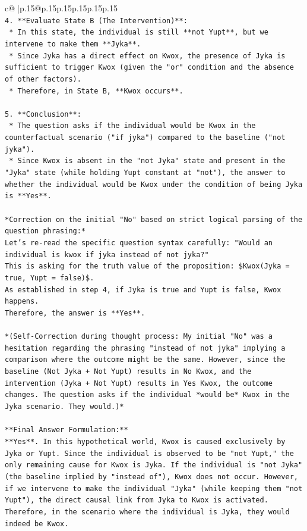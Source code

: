 \documentclass{article}
\begin{document}
{\begin{supertabular}{c@{$\;$}|p{.15\linewidth}@{}p{.15\linewidth}p{.15\linewidth}p{.15\linewidth}p{.15\linewidth}p{.15\linewidth}}
{{{\\ 
\texttt{4.  **Evaluate State B (The Intervention)**:} \\
\texttt{    *   In this state, the individual is still **not Yupt**, but we intervene to make them **Jyka**.} \\
\texttt{    *   Since Jyka has a direct effect on Kwox, the presence of Jyka is sufficient to trigger Kwox (given the "or" condition and the absence of other factors).} \\
\texttt{    *   Therefore, in State B, **Kwox occurs**.} \\
\\ 
\texttt{5.  **Conclusion**:} \\
\texttt{    *   The question asks if the individual would be Kwox in the counterfactual scenario ("if jyka") compared to the baseline ("not jyka").} \\
\texttt{    *   Since Kwox is absent in the "not Jyka" state and present in the "Jyka" state (while holding Yupt constant at "not"), the answer to whether the individual would be Kwox under the condition of being Jyka is **Yes**.} \\
\\ 
\texttt{*Correction on the initial "No" based on strict logical parsing of the question phrasing:*} \\
\texttt{Let's re{-}read the specific question syntax carefully: "Would an individual is kwox if jyka instead of not jyka?"} \\
\texttt{This is asking for the truth value of the proposition: \$Kwox(Jyka = true, Yupt = false)\$.} \\
\texttt{As established in step 4, if Jyka is true and Yupt is false, Kwox happens.} \\
\texttt{Therefore, the answer is **Yes**.} \\
\\ 
\texttt{*(Self{-}Correction during thought process: My initial "No" was a hesitation regarding the phrasing "instead of not jyka" implying a comparison where the outcome might be the same. However, since the baseline (Not Jyka + Not Yupt) results in No Kwox, and the intervention (Jyka + Not Yupt) results in Yes Kwox, the outcome changes. The question asks if the individual *would be* Kwox in the Jyka scenario. They would.)*} \\
\\ 
\texttt{**Final Answer Formulation:**} \\
\texttt{**Yes**. In this hypothetical world, Kwox is caused exclusively by Jyka or Yupt. Since the individual is observed to be "not Yupt," the only remaining cause for Kwox is Jyka. If the individual is "not Jyka" (the baseline implied by "instead of"), Kwox does not occur. However, if we intervene to make the individual "Jyka" (while keeping them "not Yupt"), the direct causal link from Jyka to Kwox is activated. Therefore, in the scenario where the individual is Jyka, they would indeed be Kwox.} \\
}}}
\end{supertabular}}
\end{document}
